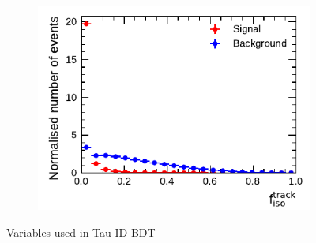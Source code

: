 \begin{figure}[!ht]
\begin{subfigure}{0.5\textwidth}
  \end{subfigure}%
  \begin{subfigure}{0.5\textwidth}
    \centering
    \includegraphics{./figures/baseline_bdt_vars/3p/SumPtTrkFrac.pdf}
  \end{subfigure}%
  \caption{Variables used in Tau-ID BDT}
  \label{fig:bdt_vars_3p_overlays}
\end{figure}

